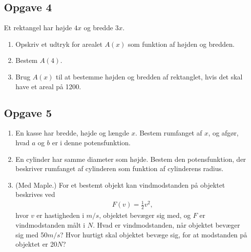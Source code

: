 \subsection*{Opgave 4}
Et rektangel har højde $4x$ og bredde $3x$. 
\begin{enumerate}[label=\roman*)]
	\item Opskriv et udtryk for arealet $A(x)$ som funktion af højden og bredden. 
	\item Bestem $A(4)$.
	\item Brug $A(x)$ til at bestemme højden og bredden af rektanglet, hvis det skal have et areal på 1200.
\end{enumerate}



\subsection*{Opgave 5}
\begin{enumerate}[label=\roman*)]
	\item En kasse har bredde, højde og længde $x$. Bestem rumfanget af $x$, og afgør, hvad $a$ og $b$ er i denne potensfunktion.
	\item En cylinder har samme diameter som højde. Bestem den potensfunktion, der beskriver rumfanget af cylinderen som funktion af cylinderens radius. 

	\item (Med Maple.) For et bestemt objekt kan vindmodstanden på objektet beskrives ved 
	\begin{align*}
		F(v)= \frac{1}{2}v^2,
	\end{align*}
	hvor $v$ er hastigheden i $m/s$, objektet bevæger sig med, og $F$ er vindmodstanden målt i $N$. Hvad er vindmodstanden, når objektet bevæger sig med 50$m/s$? Hvor hurtigt
	skal objektet bevæge sig, for at modstanden på objektet er 20$N$?
\end{enumerate}
